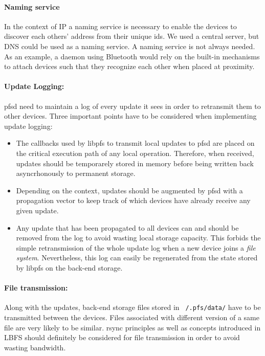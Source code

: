 \paragraph {Naming service}
In the context of IP a naming service is necessary to enable the
devices to discover each others' address from their unique ids. We
used a central server, but DNS could be used as a naming service. A
naming service is not always needed. As an example, a daemon using
Bluetooth would rely on the built-in mechanisms to attach devices such
that they recognize each other when placed at proximity.

\paragraph {Update Logging:}
pfsd need to maintain a log of every update it sees in order to
retransmit them to other devices. Three important points have to be
considered when implementing update logging:
\begin{itemize}
\item The callbacks used by libpfs to transmit local updates to pfsd
  are placed on the critical execution path of any local
  operation. Therefore, when received, updates should be temporarely
  stored in memory before being written back asyncrhonously to
  permanent storage.
\item Depending on the context, updates should be augmented by pfsd
  with a propagation vector to keep track of which devices have
  already receive any given update.
\item Any update that has been propagated to all devices can and
  should be removed from the log to avoid wasting local storage
  capacity. This forbids the simple retransmission of the whole update
  log when a new device joins a \emph{file system}. Nevertheless, this
  log can easily be regenerated from the state stored by libpfs on the
  back-end storage.
\end{itemize}

\paragraph {File transmission:}
Along with the updates, back-end storage files stored in {\tt
  /.pfs/data/} have to be transmitted between the devices. Files
associated with different version of a same file are very likely to be
similar. rsync\cite{tridgell:rsync} principles as well as concepts
introduced in LBFS\cite{muthitacharoen:lbfs} should definitely be
considered for file transmission in order to avoid wasting bandwidth.

